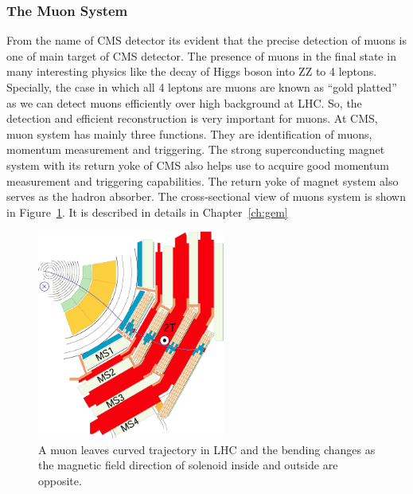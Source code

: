 \subsubsection{The Muon System} %
\label{sub:the_muon_system}
From the name of CMS detector its evident that the precise detection of muons is one of main target of CMS detector. The presence of muons in the final state in many interesting physics like the decay of Higgs boson into ZZ to 4 leptons. Specially, the case in which all 4 leptons are muons are known as ``gold platted'' as we can detect muons efficiently over high background at LHC. So, the detection and efficient reconstruction is very important for muons. At CMS, muon system has mainly three functions. They are identification of muons, momentum measurement and triggering. The strong superconducting magnet system with its return yoke of CMS also helps use to acquire good momentum measurement and triggering capabilities. The return yoke of magnet system also serves as the hadron absorber. The cross-sectional view of muons system is shown in Figure~\ref{fig:muon-system-cross}. It is described in details in Chapter~\ref{ch:gem}

\begin{figure}[htbp]
	\centering
	\includegraphics[width=0.55\textwidth]{figures/LHC/MuStations.png}
	\caption{A muon leaves curved trajectory in LHC and the bending changes as the magnetic field direction of solenoid inside and outside are opposite.}
	\label{fig:muon-system-cross}
\end{figure}



